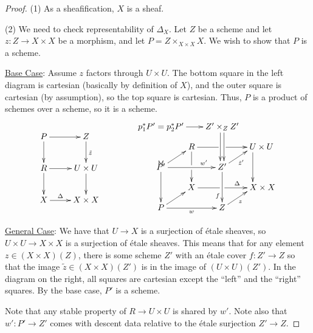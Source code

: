  \begin{proof}
   (1) As a sheafification, $X$ is a sheaf.

   (2) We need to check representability of $\Delta_X$. Let $Z$ be a scheme and let
   $z:Z\to X\times X$ be a morphism, and let $P = Z\times_{X\times X} X$. We wish to show
   that $P$ is a scheme.

   \underline{Base Case}: Assume $z$ factors through $U\times U$.
   The bottom square in the left diagram is cartesian (basically by definition of $X$),
   and the outer square is cartesian (by assumption), so the top square is cartesian.
   Thus, $P$ is a product of schemes over a scheme, so it is a scheme.
   \[\xymatrix{
      P\ar[r] \ar[d] & Z\ar[d]^{\tilde z}\\
      R\ar[r] \ar[d] & U\times U\ar[d]\\
      X\ar[r]^<>(.5)\Delta & X\times X
   }\qquad\qquad
   \raisebox{1pc}{$\xymatrix@!0 @C+1pc{
      p_1^*P'= p_2^*P'\ar[rr]& & Z'\times_Z Z' \ar@<.5ex>[dd] \ar@<-.5ex>[dd] \\
      & R \ar[rr]|(.48)\hole|(.52)\hole \ar[dd]|\hole& & **[r] U\times U \ar[dd] \\
      P' \ar@{<-}p+(.4,1.3) \ar@{<-}p+(-.4,1.3) \ar[ur] \ar[rr]^(.7){w'}\ar[dd] & & Z' \ar[dd]_(.7)f \ar[ur]_{\tilde z'}\\
      & X\ar[rr]^<>(.8)\Delta|\hole & & **[r] X\times X\\
      P \ar[rr]_w \ar[ur] & & Z \ar[ur]_z
    }$}\]

   \underline{General Case}: We have that $U\to X$ is a surjection of \'etale sheaves, so
   $U\times U\to X\times X$ is a surjection of \'etale sheaves. This means that for any
   element $z\in (X\times X)(Z)$, there is some scheme $Z'$ with an \'etale cover $f:Z'\to
   Z$ so that the image $\tilde z\in (X\times X)(Z')$ is in the image of $(U\times
   U)(Z')$. In the diagram on the right, all squares are cartesian except the ``left''
   and the ``right'' squares. By the base case, $P'$ is a scheme.

   Note that any stable property of $R\to U\times U$ is shared by $w'$. Note also that
   $w':P'\to Z'$ comes with descent data relative to the \'etale surjection $Z'\to Z$.


\end{proof}
